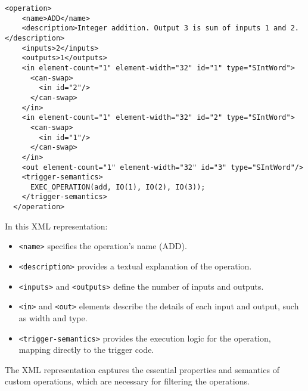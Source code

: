 \begin{lstlisting}[caption={The XML representation of ADD}]
  <operation>
    <name>ADD</name>
    <description>Integer addition. Output 3 is sum of inputs 1 and 2.</description>
    <inputs>2</inputs>
    <outputs>1</outputs>
    <in element-count="1" element-width="32" id="1" type="SIntWord">
      <can-swap>
        <in id="2"/>
      </can-swap>
    </in>
    <in element-count="1" element-width="32" id="2" type="SIntWord">
      <can-swap>
        <in id="1"/>
      </can-swap>
    </in>
    <out element-count="1" element-width="32" id="3" type="SIntWord"/>
    <trigger-semantics>
      EXEC_OPERATION(add, IO(1), IO(2), IO(3));
    </trigger-semantics>
  </operation>
\end{lstlisting}

In this XML representation:
\begin{itemize}
  \item \texttt{<name>} specifies the operation's name (ADD).
  \item \texttt{<description>} provides a textual explanation of the operation.
  \item \texttt{<inputs>} and \texttt{<outputs>} define the number of inputs and outputs.
  \item \texttt{<in>} and \texttt{<out>} elements describe the details of each input and output, such as width and type.
  \item \texttt{<trigger-semantics>} provides the execution logic for the operation, mapping directly to the trigger code.
\end{itemize}

The XML representation captures the essential properties and semantics of custom operations,
which are necessary for filtering the operations.
